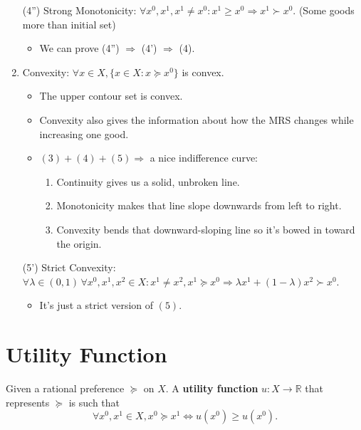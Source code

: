 \begin{enumerate}
    \item[(4'')] Strong Monotonicity: $\forall x^{0}, x^{1}, x^{1} \neq x^{0}: x^{1} \geq x^{0} \Longrightarrow x^{1} \succ x^{0}$. (Some goods more than initial set) \begin{itemize}
              \item We can prove (4'') $\Longrightarrow$ (4') $\Longrightarrow$ (4).
          \end{itemize}
    \item Convexity: $\forall x \in X, \{x \in X: x \succeq x^0\}$ is convex. \begin{itemize}
              \item The upper contour set is convex.
              \item Convexity also gives the information about how the MRS changes while increasing one good.
              \item $(3)+(4)+(5) \Longrightarrow$ a nice indifference curve: \begin{enumerate}
                        \item Continuity gives us a solid, unbroken line.
                        \item Monotonicity makes that line slope downwards from left to right.
                        \item Convexity bends that downward-sloping line so it's bowed in toward the origin.
                    \end{enumerate}
          \end{itemize}
    \item[(5')] Strict Convexity: $\forall \lambda \in (0,1)\, \forall x^0,x^1,x^2 \in X: x^1 \neq x^2, x^1 \succeq x^0 \Longrightarrow \lambda x^1 + (1-\lambda)x^2 \succ x^0$. \begin{itemize}
              \item It's just a strict version of $(5)$.
          \end{itemize}
\end{enumerate}

\section{Utility Function}

\begin{definition}
    Given a rational preference $\succeq $ on $X$. A \textbf{utility function} $u: X \longrightarrow \mathbb{R}$ that represents $\succeq $ is such that \[
        \forall x^0,x^1 \in X, x^0 \succeq x^1 \iff u(x^0) \geq u(x^0).
    \]
\end{definition}

